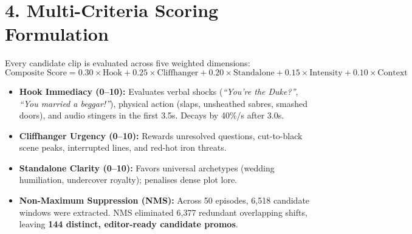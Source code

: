 \documentclass[10pt,a4paper]{article}
\begin{document}
\section*{4. Multi-Criteria Scoring Formulation}
Every candidate clip is evaluated across five weighted dimensions:
$$\text{Composite Score} = 0.30 \times \text{Hook} + 0.25 \times \text{Cliffhanger} + 0.20 \times \text{Standalone} + 0.15 \times \text{Intensity} + 0.10 \times \text{Context}$$
\begin{itemize}[leftmargin=1.2em]
    \item \textbf{Hook Immediacy (0--10):} Evaluates verbal shocks (\textit{``You're the Duke?''}, \textit{``You married a beggar!''}), physical action (slaps, unsheathed sabres, smashed doors), and audio stingers in the first 3.5s. Decays by 40\%/s after 3.0s.
    \item \textbf{Cliffhanger Urgency (0--10):} Rewards unresolved questions, cut-to-black scene peaks, interrupted lines, and red-hot iron threats.
    \item \textbf{Standalone Clarity (0--10):} Favors universal archetypes (wedding humiliation, undercover royalty); penalises dense plot lore.
    \item \textbf{Non-Maximum Suppression (NMS):} Across 50 episodes, 6,518 candidate windows were extracted. NMS eliminated 6,377 redundant overlapping shifts, leaving \textbf{144 distinct, editor-ready candidate promos}.
\end{itemize}
\end{document}
